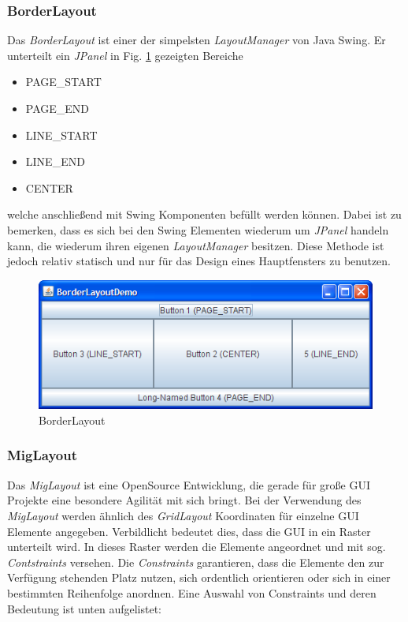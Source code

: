 \documentclass[a4paper, 11pt]{article} %
\begin{document}
\subsubsection{BorderLayout}
Das \emph{BorderLayout} ist einer der simpelsten \emph{LayoutManager} von Java Swing. Er unterteilt ein \emph{JPanel} in Fig. \ref{fig:borderlayout} gezeigten Bereiche
\begin{itemize}
    \item {PAGE\_START}
    \item {PAGE\_END}
    \item {LINE\_START}
    \item {LINE\_END}
    \item {CENTER}
\end{itemize}
welche anschließend mit Swing Komponenten befüllt werden können. Dabei ist zu bemerken, dass es sich bei den Swing Elementen wiederum um \emph{JPanel} handeln kann, die wiederum ihren eigenen \emph{LayoutManager} besitzen. Diese Methode ist jedoch relativ statisch und nur für das Design eines Hauptfensters zu benutzen.

\begin{figure}[!htp]
\includegraphics[width=\textwidth]{img/BorderLayoutDemo}
\caption{BorderLayout}
\label{fig:borderlayout}
\end{figure}

\subsubsection{MigLayout}
Das \emph{MigLayout} ist eine OpenSource Entwicklung, die gerade für große GUI Projekte eine besondere Agilität mit sich bringt. Bei der Verwendung des \emph{MigLayout} werden ähnlich des \emph{GridLayout} Koordinaten für einzelne GUI Elemente angegeben. Verbildlicht bedeutet dies, dass die GUI in ein Raster unterteilt wird. In dieses Raster werden die Elemente angeordnet und mit sog. \emph{Contstraints} versehen. Die \emph{Constraints} garantieren, dass die Elemente den zur Verfügung stehenden Platz nutzen, sich ordentlich orientieren oder sich in einer bestimmten Reihenfolge anordnen. Eine Auswahl von Constraints und deren Bedeutung ist unten aufgelistet:
\end{document}
